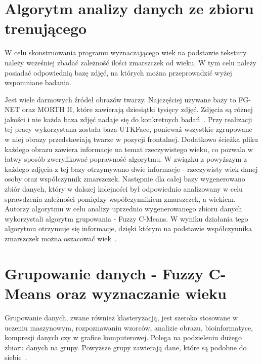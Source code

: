 \documentclass[a4paper,twoside,12pt]{book}
\begin{document}

    \section{Algorytm analizy danych ze zbioru trenującego}\label{sec:algorytmTrenowania}
    W celu skonstruowania programu wyznaczającego wiek na podstawie tekstury należy wcześniej zbadać zależność ilości
    zmarszczek od wieku.
    W tym celu należy posiadać odpowiednią bazę zdjęć, na których można przeprowadzić wyżej wspomniane badania.

    Jest wiele darmowych źródeł obrazów twarzy.
    Najczęściej używane bazy to FG-NET oraz MORTH II, które
    zawierają dziesiątki tysięcy zdjęć.
    Zdjęcia są różnej jakości i nie każda baza zdjęć nadaje się do konkretnych badań~\cite{khryashchevGanin}.
    Przy realizacji tej pracy wykorzystana została baza UTKFace,
    ponieważ wszystkie zgrupowane w niej obrazy przedstawiają twarze w pozycji frontalnej. Dodatkowo
    ścieżka pliku każdego obrazu zawiera informacje na temat rzeczywistego wieku, co pozwala w łatwy sposób
    zweryfikować poprawność algorytmu.
    W związku z powyższym z każdego zdjęcia z tej bazy otrzymywano dwie informacje - rzeczywisty wiek danej osoby oraz
    współczynnik zmarszczek.
    Następnie dla całej bazy wygenerowano zbiór danych, który w dalszej kolejności był odpowiednio analizowany w celu
    sprawdzenia zależności pomiędzy współczynnikiem zmarszczek, a wiekiem.
    Autorzy algorytmu w celu analizy uprzednio wygenerowanego zbioru danych wykorzystali algorytm grupowania -
    Fuzzy C-Means.
    W wyniku działania tego algorytmu otrzymuje się informacje, dzięki którym na podstawie współczynnika zmarszczek
    można
    oszacować wiek~\cite{wrinkleFeatures}. %
    \section{Grupowanie danych - Fuzzy C-Means oraz wyznaczanie wieku}\label{sec:grupowanieDanych}
    Grupowanie danych, zwane również klasteryzacją, jest szeroko stosowane w uczeniu maszynowym, rozpoznawaniu wzorców,
    analizie obrazu, bioinformatyce, kompresji danych czy w grafice komputerowej.
    Polega na podzieleniu dużego zbioru danych na grupy.
    Powyższe grupy zawierają dane, które są podobne do siebie~\cite{clusterWstep}.
\end{document}
